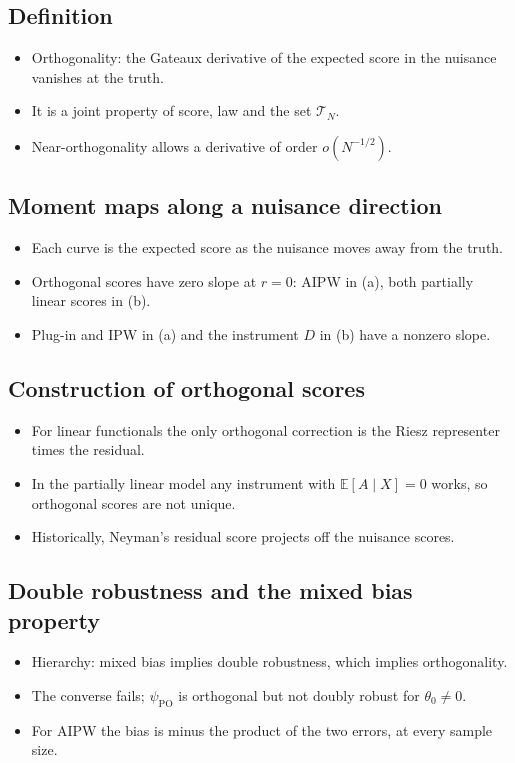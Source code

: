 \documentclass[11pt]{article}
\newcommand{\E}{\mathbb{E}}
\begin{document}
\subsection*{Definition}
\begin{itemize}
\item Orthogonality: the Gateaux derivative of the expected score in the nuisance vanishes at the truth.
\item It is a joint property of score, law and the set $\mathcal T_N$.
\item Near-orthogonality allows a derivative of order $o(N^{-1/2})$.
\end{itemize}

\subsection*{Moment maps along a nuisance direction}
\begin{itemize}
\item Each curve is the expected score as the nuisance moves away from the truth.
\item Orthogonal scores have zero slope at $r=0$: AIPW in (a), both partially linear scores in (b).
\item Plug-in and IPW in (a) and the instrument $D$ in (b) have a nonzero slope.
\end{itemize}

\subsection*{Construction of orthogonal scores}
\begin{itemize}
\item For linear functionals the only orthogonal correction is the Riesz representer times the residual.
\item In the partially linear model any instrument with $\E[A\mid X]=0$ works, so orthogonal scores are not unique.
\item Historically, Neyman's residual score projects off the nuisance scores.
\end{itemize}

\subsection*{Double robustness and the mixed bias property}
\begin{itemize}
\item Hierarchy: mixed bias implies double robustness, which implies orthogonality.
\item The converse fails; $\psi_{\mathrm{PO}}$ is orthogonal but not doubly robust for $\theta_0\neq0$.
\item For AIPW the bias is minus the product of the two errors, at every sample size.
\end{itemize}
\end{document}
